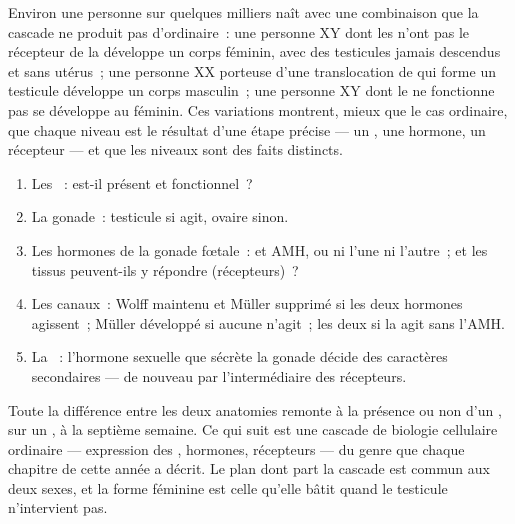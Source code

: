 \begin{example}\label{ex:g11:becoming-male-female:disagree}
Environ une personne sur quelques milliers naît avec une combinaison
que la cascade ne produit pas d'ordinaire~: une personne XY dont les
 n'ont pas le récepteur de la  développe un corps
féminin, avec des testicules jamais descendus et sans utérus~; une
personne XX porteuse d'une translocation de  qui forme un testicule
développe un corps masculin~; une personne XY dont le  ne fonctionne
pas se développe au féminin. Ces variations montrent, mieux que le cas
ordinaire, que chaque niveau est le résultat d'une étape précise --- un
, une hormone, un récepteur --- et que les niveaux sont des faits
distincts.
\end{example}

\begin{method}\label{met:g11:becoming-male-female:case}
\begin{enumerate}
  \item Les ~:  est-il présent et fonctionnel~?
  \item La gonade~: testicule si  agit, ovaire sinon.
  \item Les hormones de la gonade fœtale~:  et AMH, ou
        ni l'une ni l'autre~; et les tissus peuvent-ils y répondre
        (récepteurs)~?
  \item Les canaux~: Wolff maintenu et Müller supprimé si les deux
        hormones agissent~; Müller développé si aucune n'agit~; les
        deux si la  agit sans l'AMH.
  \item La ~: l'hormone sexuelle que sécrète la gonade décide
        des caractères secondaires --- de nouveau par l'intermédiaire
        des récepteurs.
\end{enumerate}
\end{method}

\begin{remark}\label{rem:g11:becoming-male-female:onegene}
Toute la différence entre les deux anatomies remonte à la présence ou
non d'un , sur un , à la septième semaine. Ce qui suit
est une cascade de biologie cellulaire ordinaire --- expression des
, hormones, récepteurs --- du genre que chaque chapitre de cette
année a décrit. Le plan dont part la cascade est commun aux deux sexes,
et la forme féminine est celle qu'elle bâtit quand le testicule
n'intervient pas.
\end{remark}

